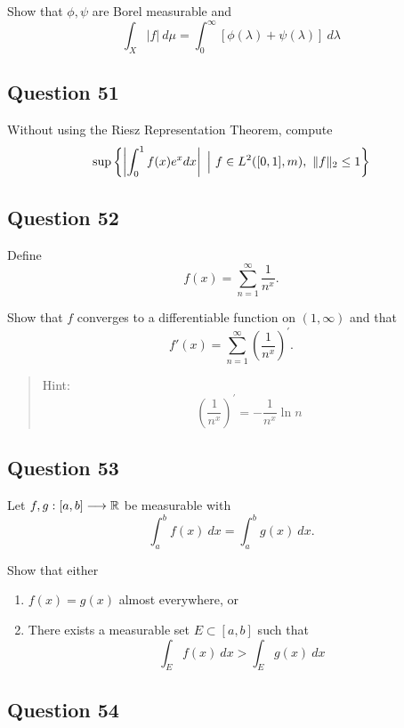 \documentclass[12pt]{article}
\providecommand{\tightlist}{%
  \setlength{\itemsep}{0pt}\setlength{\parskip}{0pt}}
\begin{document}
Show that \(\phi, \psi\) are Borel measurable and \[
\int_{X}|f| ~d \mu=\int_{0}^{\infty}[\phi(\lambda)+\psi(\lambda)] ~d \lambda
\]

\hypertarget{question-51-1}{%
\subsection{Question 51}\label{question-51-1}}

Without using the Riesz Representation Theorem, compute \[
\sup \left\{\left|\int_{0}^{1} f(x) e^{x} d x\right| {~\mathrel{\Big|}~} f \in L^{2}([0,1], m),~~ \|f\|_{2} \leq 1\right\}
\]

\hypertarget{question-52-1}{%
\subsection{Question 52}\label{question-52-1}}

Define \[
f(x) = \sum_{n=1}^{\infty} \frac{1}{n^{x}}.
\]

Show that \(f\) converges to a differentiable function on
\((1, \infty)\) and that \[
f'(x)  =\sum_{n=1}^{\infty}\left(\frac{1}{n^{x}}\right)^{\prime}.
\]

\begin{quote}
Hint: \[
\left(\frac{1}{n^{x}}\right)^{\prime}=-\frac{1}{n^{x}} \ln n
\]
\end{quote}

\hypertarget{question-53-1}{%
\subsection{Question 53}\label{question-53-1}}

Let \(f, g: [a, b] \longrightarrow {\mathbb{R}}\) be measurable with \[
\int_{a}^{b} f(x) ~d x=\int_{a}^{b} g(x) ~d x.
\]

Show that either

\begin{enumerate}
\def\labelenumi{\arabic{enumi}.}
\tightlist
\item
  \(f(x) = g(x)\) almost everywhere, or
\item
  There exists a measurable set \(E \subset [a, b]\) such that \[
  \int_{E} f(x) ~d x>\int_{E} g(x) ~d x
  \]
\end{enumerate}

\hypertarget{question-54-1}{%
\subsection{Question 54}\label{question-54-1}}
\end{document}
